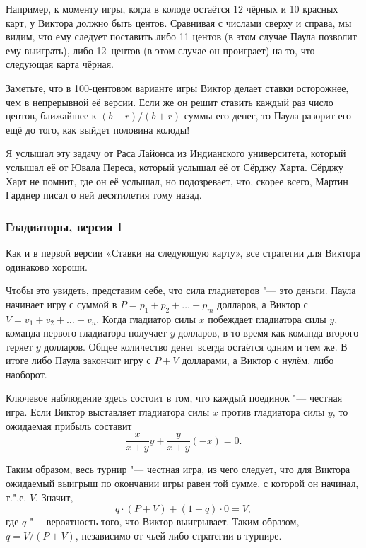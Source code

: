 \documentclass[twoside]{book}
\begin{document}
Например, к моменту игры, когда в колоде остаётся 12 чёрных и 10 красных карт, у Виктора должно быть  центов. 
Сравнивая с числами сверху и справа, мы видим, что ему следует поставить либо 11 центов (в этом случае Паула позволит ему выиграть), либо 12~центов (в этом случае он проиграет) на то, что следующая карта чёрная.

Заметьте, что в 100-центовом варианте игры Виктор делает ставки осторожнее, чем в непрерывной её версии.
Если же он решит ставить каждый раз число центов, ближайшее к $(b - r)/(b + r)$ суммы его денег, то Паула разорит его ещё до того, как выйдет половина колоды!

\medskip

Я услышал эту задачу от Раса Лайонса из Индианского университета, %
который услышал её от Ювала Переса, %
который услышал её от Сёрджу Харта. %
Сёрджу Харт не помнит, где он её услышал, но подозревает, что, скорее всего, Мартин Гарднер писал о ней десятилетия тому назад.

\subsubsection*{Гладиаторы, версия I}%

Как и в первой версии «Ставки на следующую карту», все стратегии для Виктора одинаково хороши.

Чтобы это увидеть, представим себе, что сила гладиаторов "--- это деньги.
Паула начинает игру с суммой в $P = p_1 + p_2 + \ldots + p_m$ долларов, 
а Виктор с $V = v_1 + v_2 + \ldots + v_n$.
Когда гладиатор силы $x$ побеждает гладиатора силы $y$, команда первого гладиатора получает $y$ долларов, в то время как команда второго теряет $y$ долларов.
Общее количество денег всегда остаётся одним и тем же.
В итоге либо Паула закончит игру с $P+V$ долларами, а Виктор с нулём, либо наоборот.

Ключевое наблюдение здесь состоит в том, что каждый поединок "--- честная игра.
Если Виктор выставляет гладиатора силы $x$ против гладиатора силы $y$, то ожидаемая прибыль составит 
\[\frac{x}{x+y}y + \frac{y}{x+y}(-x) =0.\]

Таким образом, весь турнир "--- честная игра, из чего следует, что для Виктора ожидаемый выигрыш по окончании игры равен той сумме, с которой он начинал, т.",е. $V$.
Значит,
\[q\cdot(P + V) + (1-q)\cdot0 = V,\]
где $q$ "--- вероятность того, что Виктор выигрывает.
Таким образом, $q = V/(P+V)$,
независимо от чьей-либо стратегии в турнире.
\heart
\end{document}
